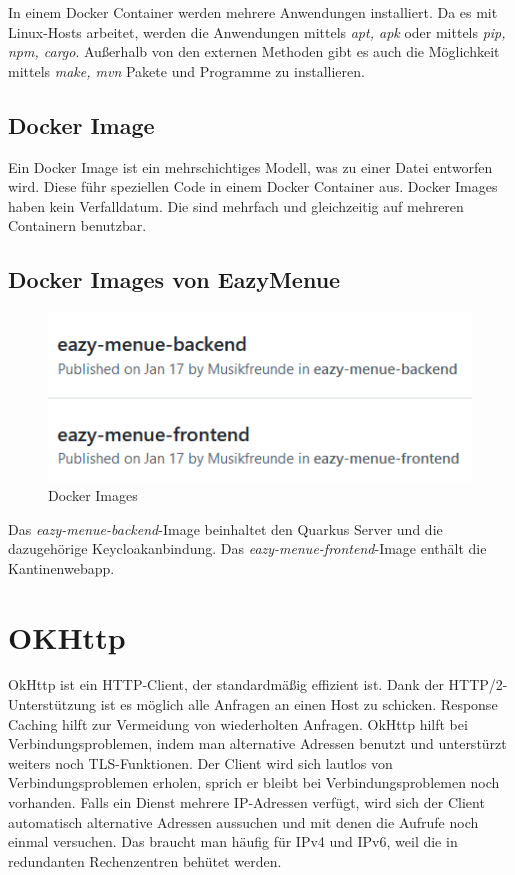 In einem Docker Container werden mehrere Anwendungen installiert. Da es mit Linux-Hosts arbeitet, werden 
die Anwendungen mittels \textit{apt, apk} oder mittels \textit{pip, npm, cargo}. Außerhalb von den externen Methoden
gibt es auch die Möglichkeit mittels \textit{make, mvn} Pakete und Programme zu installieren.

\subsection{Docker Image}

Ein Docker Image ist ein mehrschichtiges Modell, was zu einer Datei entworfen wird. Diese führ speziellen Code in einem Docker Container aus.
Docker Images haben kein Verfalldatum. Die sind mehrfach und gleichzeitig auf mehreren Containern benutzbar.

\subsection{Docker Images von EazyMenue}
\begin{figure}[htp]
    \author{Bozidar Spasenovic}
    \centering
    \includegraphics[scale=0.80]{pics/docker-images.PNG}
    \caption{Docker Images}
    \label{fig:impl:docker-images}
\end{figure}   

Das \textit{eazy-menue-backend}-Image beinhaltet den Quarkus Server und die dazugehörige Keycloakanbindung.
Das \textit{eazy-menue-frontend}-Image enthält die Kantinenwebapp.

\section{OKHttp}
\cite{OkHttp}
\author{Bozidar Spasenovic}
OkHttp ist ein HTTP-Client, der standardmäßig effizient ist.
Dank der HTTP/2-Unterstützung ist es möglich alle Anfragen an einen Host zu schicken. 
Response Caching hilft zur Vermeidung von wiederholten Anfragen.
\linebreak  
OkHttp hilft bei Verbindungsproblemen, indem man alternative Adressen benutzt und unterstürzt weiters noch TLS-Funktionen.
Der Client wird sich lautlos von Verbindungsproblemen erholen, sprich er bleibt bei Verbindungsproblemen noch vorhanden.
\linebreak
Falls ein Dienst mehrere IP-Adressen verfügt, wird sich der Client automatisch alternative Adressen aussuchen und mit denen
die Aufrufe noch einmal versuchen.
Das braucht man häufig für IPv4 und IPv6, weil die in redundanten Rechenzentren behütet werden. 


